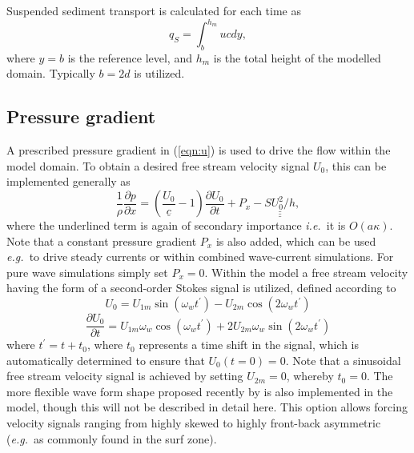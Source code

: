 \documentclass[12pt]{article}
\newcommand{\ie}{{\it i.e.\ }}
\newcommand{\eg}{{\it e.g.\ }}
\begin{document}
Suspended sediment transport is calculated for each time as
%
\begin{equation}
q_S = \int_b^{h_m} uc dy,
\end{equation}
%
where $y=b$ is the reference level, and $h_m$ is the total height of
the modelled domain.  Typically $b=2d$ is utilized.




\subsection{Pressure gradient}

A prescribed pressure gradient in (\ref{eqn:u}) is used to drive the
flow within the model domain.  To obtain a desired free stream
velocity signal $U_0$, this can be implemented generally as
%
\begin{equation}
\frac{1}{\rho}\frac{\partial p}{\partial x} =
\left( \underline{\frac{U_0}{c}}-1 \right)
\frac{\partial U_0}{\partial t} + P_x
-\underline{\underline{\underline{S U_0^2/h}}}
,
\label{eqn:px}
\end{equation}
%
where the underlined term is again of secondary importance \ie it is
$O(a\kappa)$.  Note that a constant pressure gradient $P_x$ is also
added, which can be used \eg to drive steady currents or within
combined wave-current simulations.  For pure wave simulations simply
set $P_x=0$.  Within the model a free stream velocity having the form
of a second-order Stokes signal is utilized, defined according to
%
\begin{equation}
U_0 = U_{1m}\sin(\omega_w t^\prime) - U_{2m}\cos(2\omega_w t^\prime)
\label{eqn:U}
\end{equation}
%
\begin{equation}
\frac{\partial U_0}{\partial t} = 
U_{1m}\omega_w\cos(\omega_w t^\prime)
+ 2U_{2m}\omega_w\sin(2\omega_w t^\prime)
\label{eqn:Ut}
\end{equation}
%
where $t^\prime=t+t_0$, where $t_0$ represents a time shift in the
signal, which is automatically determined to ensure that $U_0(t=0)=0$.
Note that a sinusoidal free stream velocity signal is achieved by
setting $U_{2m}=0$, whereby $t_0=0$.  The more flexible wave form
shape proposed recently by \cite{Abreuetal2010} is also implemented
in the model, though this will not be described in detail here.  This
option allows forcing velocity signals ranging from highly skewed to
highly front-back asymmetric (\eg as commonly found in the surf zone).
\end{document}
